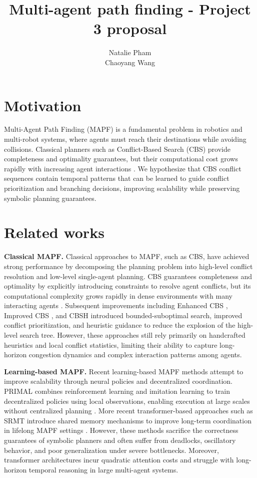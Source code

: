 \documentclass{article}
\title{Multi-agent path finding - Project 3 proposal}
\author{%
  Natalie Pham \\
  \And
  Chaoyang Wang
}
\theoremstyle{plain}
\theoremstyle{definition}
\theoremstyle{remark}
\begin{document}
\maketitle
\vspace{-25pt}
\section{Motivation}
\vspace{-10pt}
Multi-Agent Path Finding (MAPF) is a fundamental problem in robotics and multi-robot systems, where agents must reach their destinations while avoiding collisions. Classical planners such as Conflict-Based Search (CBS) provide completeness and optimality guarantees, but their computational cost grows rapidly with increasing agent interactions \cite{sharon2015conflict}. We hypothesize that CBS conflict sequences contain temporal patterns that can be learned to guide conflict prioritization and branching decisions, improving scalability while preserving symbolic planning guarantees.
\vspace{-10pt}
\section{Related works}
\vspace{-10pt}
\textbf{Classical MAPF. }Classical approaches to MAPF, such as CBS, have achieved strong performance by decomposing the planning problem into high-level conflict resolution and low-level single-agent planning. CBS guarantees completeness and optimality by explicitly introducing constraints to resolve agent conflicts, but its computational complexity grows rapidly in dense environments with many interacting agents \cite{sharon2015conflict}. Subsequent improvements including Enhanced CBS \cite{barer2014suboptimal}, Improved CBS \cite{boyarski2015icbs}, and CBSH \cite{li2019disjoint} introduced bounded-suboptimal search, improved conflict prioritization, and heuristic guidance to reduce the explosion of the high-level search tree. However, these approaches still rely primarily on handcrafted heuristics and local conflict statistics, limiting their ability to capture long-horizon congestion dynamics and complex interaction patterns among agents.

\textbf{Learning-based MAPF. }Recent learning-based MAPF methods attempt to improve scalability through neural policies and decentralized coordination. PRIMAL combines reinforcement learning and imitation learning to train decentralized policies using local observations, enabling execution at large scales without centralized planning \cite{sartoretti2019primal}. More recent transformer-based approaches such as SRMT introduce shared memory mechanisms to improve long-term coordination in lifelong MAPF settings \cite{wang2025srmt}. However, these methods sacrifice the correctness guarantees of symbolic planners and often suffer from deadlocks, oscillatory behavior, and poor generalization under severe bottlenecks. Moreover, transformer architectures incur quadratic attention costs and struggle with long-horizon temporal reasoning in large multi-agent systems.
\end{document}
